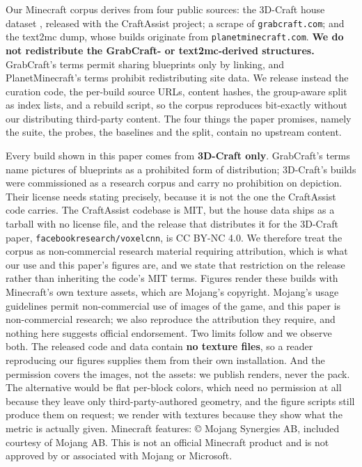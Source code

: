 Our Minecraft corpus derives from four public sources: the 3D-Craft house
dataset \citep{chen2019voxelcnn,gray2019craftassist}, released with the
CraftAssist project; a scrape of \texttt{grabcraft.com}; and the
text2mc dump, whose builds originate from \texttt{planetminecraft.com}. \textbf{We
do not redistribute the GrabCraft- or text2mc-derived structures.} GrabCraft's
terms permit sharing blueprints only by linking, and PlanetMinecraft's terms
prohibit redistributing site data. We release instead the curation code, the
per-build source URLs, content hashes, the group-aware split as index lists, and
a rebuild script, so the corpus reproduces bit-exactly without our distributing
third-party content. The four things the paper promises, namely the suite, the
probes, the baselines and the split, contain no upstream content.

Every build shown in this paper comes from \textbf{3D-Craft only}. GrabCraft's terms name pictures of blueprints
as a prohibited form of distribution; 3D-Craft's builds were commissioned as a
research corpus and carry no prohibition on depiction. Their license needs
stating precisely, because it is not the one the CraftAssist code carries. The
CraftAssist codebase is MIT, but the house data ships as a tarball with no
license file, and the release that distributes it for the 3D-Craft paper,
\texttt{facebookresearch/voxelcnn}, is CC BY-NC 4.0. We therefore treat the
corpus as non-commercial research material requiring attribution, which is what
our use and this paper's figures are, and we state that restriction on the
release rather than inheriting the code's MIT terms. Figures render these builds
with Minecraft's own texture assets, which are Mojang's copyright. Mojang's
usage guidelines permit non-commercial use of images of the game, and this
paper is non-commercial research; we also reproduce the attribution they
require, and nothing here suggests official endorsement. Two limits follow and
we observe both. The released code and data contain \textbf{no texture files},
so a reader reproducing our figures supplies them from their own installation.
And the permission covers the images, not the assets: we publish renders, never
the pack. The alternative would be flat per-block colors, which need no
permission at all because they leave only third-party-authored geometry, and
the figure scripts still produce them on request; we render with textures
because they show what the metric is actually given. Minecraft features: \copyright{} Mojang Synergies
AB, included courtesy of Mojang AB. This is not an official Minecraft product and
is not approved by or associated with Mojang or Microsoft.

